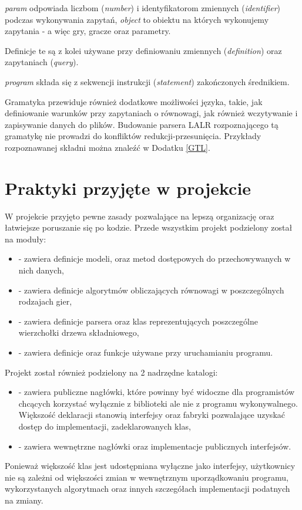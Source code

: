 \documentclass[polish]{standalone}
\begin{document}
\textit{param} odpowiada liczbom (\textit{number}) i identyfikatorom zmiennych (\textit{identifier}) podczas wykonywania
zapytań, \textit{object} to obiektu na których wykonujemy zapytania - a więc gry, gracze oraz parametry.

Definicje te są z kolei używane przy definiowaniu zmiennych (\textit{definition}) oraz zapytaniach (\textit{query}).

\textit{program} składa się z sekwencji instrukcji (\textit{statement}) zakończonych średnikiem.

Gramatyka przewiduje również dodatkowe możliwości języka, takie, jak definiowanie warunków przy zapytaniach o równowagi,
jak również wczytywanie i zapisywanie danych do plików. Budowanie parsera LALR rozpoznającego tą gramatykę nie prowadzi
do konfliktów redukcji-przesunięcia. Przykłady rozpoznawanej składni można znaleźć w Dodatku \ref{GTL}.

\section{Praktyki przyjęte w projekcie}

W projekcie przyjęto pewne zasady pozwalające na lepszą organizację oraz łatwiejsze poruszanie się po kodzie. Przede
wszystkim projekt podzielony został na moduły:
\begin{itemize}
\item {} - zawiera definicje modeli, oraz metod dostępowych do przechowywanych w nich danych,
\item {} - zawiera definicje algorytmów obliczających równowagi w poszczególnych rodzajach gier,
\item {} - zawiera definicje parsera oraz klas reprezentujących poszczególne wierzchołki drzewa składniowego,
\item {} - zawiera definicje oraz funkcje używane przy uruchamianiu programu.
\end{itemize}

Projekt został również podzielony na 2 nadrzędne katalogi:
\begin{itemize}
\item {} - zawiera publiczne nagłówki, które powinny być widoczne dla programistów chcących korzystać
wyłącznie z biblioteki ale nie z programu wykonywalnego. Większość deklaracji stanowią interfejsy oraz fabryki
pozwalające uzyskać dostęp do implementacji, zadeklarowanych klas,
\item {} - zawiera wewnętrzne nagłówki oraz implementacje publicznych interfejsów.
\end{itemize}
Ponieważ większość klas jest udostępniana wyłączne jako interfejsy, użytkownicy nie są zależni od większości zmian
w wewnętrznym uporządkowaniu programu, wykorzystanych algorytmach oraz innych szczegółach implementacji podatnych
na zmiany.
\end{document}

